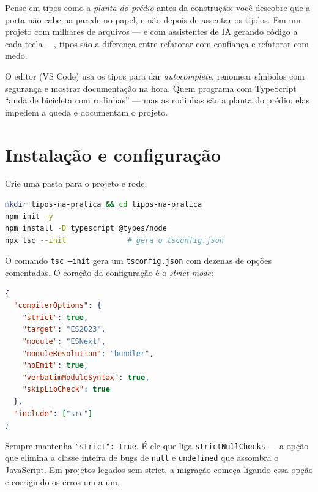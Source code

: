 Pense em tipos como a \emph{planta do prédio} antes da construção: você
descobre que a porta não cabe na parede no papel, e não depois de assentar os
tijolos. Em um projeto com milhares de arquivos — e com assistentes de IA
gerando código a cada tecla —, tipos são a diferença entre refatorar com
confiança e refatorar com medo.

\begin{caixadica}
O editor (VS Code) usa os tipos para dar \emph{autocomplete}, renomear
símbolos com segurança e mostrar documentação na hora. Quem programa com
TypeScript ``anda de bicicleta com rodinhas'' — mas as rodinhas são a planta
do prédio: elas impedem a queda e documentam o projeto.
\end{caixadica}

\section{Instalação e configuração}

Crie uma pasta para o projeto e rode:

\begin{lstlisting}[style=livro, language=Bash,
  caption={Iniciando um projeto TypeScript.}, label={list:ts-init}]
mkdir tipos-na-pratica && cd tipos-na-pratica
npm init -y
npm install -D typescript @types/node
npx tsc --init              # gera o tsconfig.json
\end{lstlisting}

O comando \texttt{tsc --init} gera um \texttt{tsconfig.json} com dezenas de
opções comentadas. O coração da configuração é o \emph{strict mode}:

\begin{lstlisting}[style=livro, language=JSON,
  caption={Opções essenciais do tsconfig.json.}, label={list:ts-config}]
{
  "compilerOptions": {
    "strict": true,
    "target": "ES2023",
    "module": "ESNext",
    "moduleResolution": "bundler",
    "noEmit": true,
    "verbatimModuleSyntax": true,
    "skipLibCheck": true
  },
  "include": ["src"]
}
\end{lstlisting}

\begin{caixadica}
Sempre mantenha \texttt{"strict": true}. É ele que liga
\texttt{strictNullChecks} — a opção que elimina a classe inteira de bugs de
\texttt{null} e \texttt{undefined} que assombra o JavaScript. Em projetos
legados sem strict, a migração começa ligando essa opção e corrigindo os
erros um a um.
\end{caixadica}

